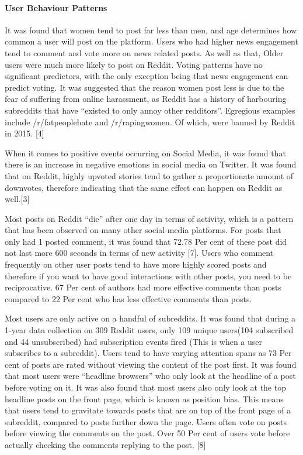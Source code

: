 \paragraph{User Behaviour Patterns}
It was found that women tend to post far less than men, and age determines how common a user will post on the platform. Users who had higher news engagement tend to comment and vote more on news related posts. As well as that, Older users were much more likely to post on Reddit.  Voting patterns have no significant predictors, with the only exception being that news engagement can predict voting. It was suggested that the reason women post less is due to the fear of suffering from online harassment, as Reddit has a history of harbouring subreddits that have “existed to only annoy other redditors”. Egregious examples include /r/fatpeoplehate and /r/rapingwomen. Of which, were banned by Reddit in 2015. [4] 

When it comes to positive events occurring on Social Media, it was found that there is an increase in negative emotions in social media on Twitter. It was found that on Reddit, highly upvoted stories tend to gather a proportionate amount of downvotes, therefore indicating that the same effect can happen on Reddit as well.[3]

Most posts on Reddit “die” after one day in terms of activity, which is a pattern that has been observed on many other social media platforms. For posts that only had 1 posted comment, it was found that 72.78 Per cent of these post did not last more  600 seconds in terms of new activity [7]. Users who comment frequently on other user posts tend to have more highly scored posts and therefore if you want to have good interactions with other posts, you need to be reciprocative. 67 Per cent of authors had more effective comments than posts compared to 22 Per cent who has less effective comments than posts.

Most users are only active on a handful of subreddits. It was found that during a 1-year data collection on 309 Reddit users, only 109 unique users(104 subscribed and 44 unsubscribed) had subscription events fired (This is when a user subscribes to a subreddit). Users tend to have varying attention spans as 73 Per cent of posts are rated without viewing the content of the post first. It was found that most users were “headline browsers” who only look at the headline of a post before voting on it. It was also found that most users also only look at the top headline posts on the front page, which is known as position bias. This means that users tend to gravitate towards posts that are on top of the front page of a subreddit, compared to posts further down the page. Users often vote on posts before viewing the comments on the post. Over 50 Per cent of users vote before actually checking the comments replying to the post. [8]

